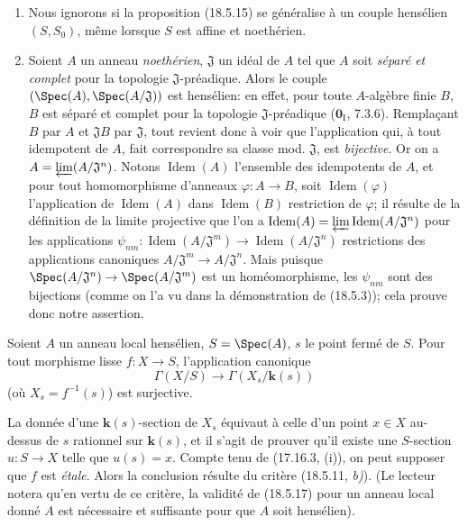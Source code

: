 \begin{remarks}[18.5.16]
\label{IV.18.5.16}
\begin{enumerate}
  \item[(i)] Nous ignorons si la proposition (18.5.15) se généralise à un couple hensélien $(S,S_0)$, même lorsque $S$ est affine et noethérien.
  \item[(ii)] Soient $A$ un anneau \emph{noethérien}, $\mathfrak J$ un idéal de $A$ tel que $A$ soit \emph{séparé et complet} pour la topologie $\mathfrak J$-préadique. Alors le couple $(\Spec(A),\Spec(A/\mathfrak J))$ est hensélien: en effet, pour toute $A$-algèbre finie $B$, $B$ est séparé et complet pour la topologie $\mathfrak J$-préadique ($\mathbf{0}_{\mathrm I}$, 7.3.6). Remplaçant $B$ par $A$ et $\mathfrak J B$ par $\mathfrak J$, tout revient donc à voir que l'application qui, à tout idempotent de $A$, fait correspondre sa classe mod. $\mathfrak J$, est \emph{bijective}. Or on a $A=\varprojlim (A/\mathfrak J^n)$. Notons $\operatorname{Idem}(A)$ l'ensemble des idempotents de $A$, et pour tout homomorphisme d'anneaux $\varphi:A\to B$, soit $\operatorname{Idem}(\varphi)$ l'application de $\operatorname{Idem}(A)$ dans $\operatorname{Idem}(B)$ restriction de $\varphi$; il résulte de la définition de la limite projective que l'on a $\operatorname{Idem}(A)=\varprojlim\operatorname{Idem}(A/\mathfrak J^n)$ pour les applications $\psi_{nm}:\operatorname{Idem}(A/\mathfrak J^m)\to\operatorname{Idem}(A/\mathfrak J^n)$ restrictions des applications canoniques $A/\mathfrak J^m\to A/\mathfrak J^n$. Mais puisque $\Spec(A/\mathfrak J^n)\to\Spec(A/\mathfrak J^m)$ est un homéomorphisme, les $\psi_{nm}$ sont des bijections (comme on l'a vu dans la démonstration de (18.5.3)); cela prouve donc notre assertion.
\end{enumerate}
\end{remarks}

\begin{theorem}[18.5.17]
\label{IV.18.5.17}
Soient $A$ un anneau local hensélien, $S=\Spec(A)$, $s$ le point fermé de $S$. Pour tout morphisme lisse $f:X\to S$, l'application canonique
\[
  \Gamma(X/S)\longrightarrow\Gamma(X_s/\boldsymbol{k}(s))
\]
\textup{(}où $X_s=f^{-1}(s)$\textup{)} est surjective.
\end{theorem}

La donnée d'une $\boldsymbol{k}(s)$-section de $X_s$ équivaut à celle d'un point $x\in X$ au-dessus de $s$ rationnel sur $\boldsymbol{k}(s)$, et il s'agit de prouver qu'il existe une $S$-section $u:S\to X$ telle que $u(s)=x$. Compte tenu de (17.16.3, (i)), on peut supposer que $f$ est \emph{étale}. Alors la conclusion résulte du critère (18.5.11, \emph{b)}). (Le lecteur notera qu'en vertu de ce critère, la validité de (18.5.17) pour un anneau local donné $A$ est nécessaire et suffisante pour que $A$ soit hensélien).


